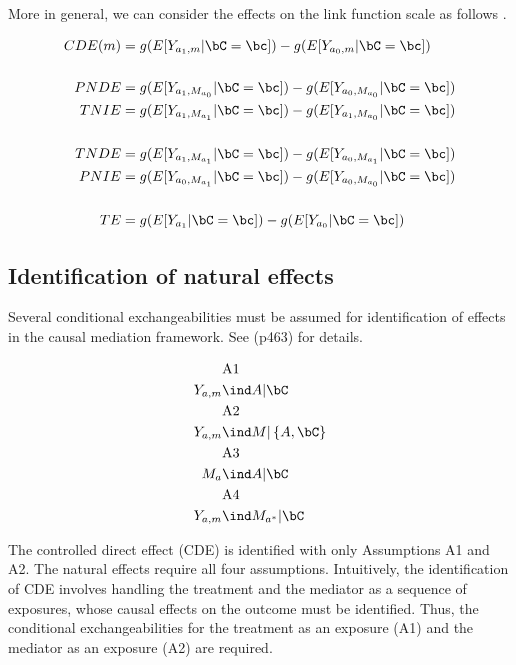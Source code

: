 \documentclass[dvipdfmx,10pt]{article}
\begin{document}
More in general, we can consider the effects on the link function scale as follows \cite{starkopfComparisonFiveSoftware2017}.

\begin{align*}
  CDE(m) &= g(E[Y_{a_{1},m} | \bC = \bc]) - g(E[Y_{a_{0},m} | \bC = \bc])\\
  \\
  PNDE &= g(E[Y_{a_{1},M_{a_{0}}} | \bC = \bc]) - g(E[Y_{a_{0},M_{a_{0}}} | \bC = \bc])\\
  TNIE &= g(E[Y_{a_{1},M_{a_{1}}} | \bC = \bc]) - g(E[Y_{a_{1},M_{a_{0}}} | \bC = \bc])\\
  \\
  TNDE &= g(E[Y_{a_{1},M_{a_{1}}} | \bC = \bc]) - g(E[Y_{a_{0},M_{a_{1}}} | \bC = \bc])\\
  PNIE &= g(E[Y_{a_{0},M_{a_{1}}} | \bC = \bc]) - g(E[Y_{a_{0},M_{a_{0}}} | \bC = \bc])\\
  \\
  TE &= g(E[Y_{a_{1}} | \bC = \bc]) - g(E[Y_{a_{0}} | \bC = \bc])\\
\end{align*}


\subsection{Identification of natural effects}
\label{sec:orge163755}
Several conditional exchangeabilities must be assumed for identification of effects in the causal mediation framework. See \cite{vanderweeleExplanationCausalInference2015} (p463) for details.

\begin{align*}
  &\text{A1}\\
  Y_{a,m} &\ind A | \bC\\
  &\text{A2}\\
  Y_{a,m} &\ind M | \left\{ A, \bC \right\}\\
  &\text{A3}\\
  M_{a} &\ind A | \bC\\
  &\text{A4}\\
  Y_{a,m} &\ind M_{a^{*}} |\bC\\
\end{align*}

The controlled direct effect (CDE) is identified with only Assumptions A1 and A2. The natural effects require all four assumptions.  Intuitively, the identification of CDE involves handling the treatment and the mediator as a sequence of exposures, whose causal effects on the outcome must be identified. Thus, the conditional exchangeabilities for the treatment as an exposure (A1) and the mediator as an exposure (A2) are required.\\
\end{document}
